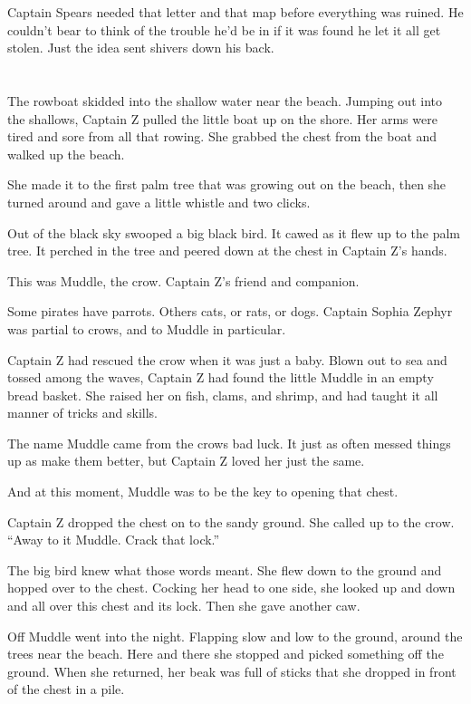 \documentclass[12pt]{extbook}
\begin{document}
  Captain Spears needed that letter and that map before everything was
  ruined. He couldn't bear to think of the trouble he'd be in if it was
  found he let it all get stolen. Just the idea sent shivers down his
  back.
  
  \section{}\label{section-10}
  
  The rowboat skidded into the shallow water near the beach. Jumping out
  into the shallows, Captain Z pulled the little boat up on the shore. Her
  arms were tired and sore from all that rowing. She grabbed the chest
  from the boat and walked up the beach.
  
  She made it to the first palm tree that was growing out on the beach,
  then she turned around and gave a little whistle and two clicks.
  
  Out of the black sky swooped a big black bird. It cawed as it flew up to
  the palm tree. It perched in the tree and peered down at the chest in
  Captain Z's hands.
  
  This was Muddle, the crow. Captain Z's friend and companion.
  
  Some pirates have parrots. Others cats, or rats, or dogs. Captain Sophia
  Zephyr was partial to crows, and to Muddle in particular.
  
  Captain Z had rescued the crow when it was just a baby. Blown out to sea
  and tossed among the waves, Captain Z had found the little Muddle in an
  empty bread basket. She raised her on fish, clams, and shrimp, and had
  taught it all manner of tricks and skills.
  
  The name Muddle came from the crows bad luck. It just as often messed
  things up as make them better, but Captain Z loved her just the same.
  
  And at this moment, Muddle was to be the key to opening that chest.
  
  Captain Z dropped the chest on to the sandy ground. She called up to the
  crow. \enquote{Away to it Muddle. Crack that lock.}
  
  The big bird knew what those words meant. She flew down to the ground
  and hopped over to the chest. Cocking her head to one side, she looked
  up and down and all over this chest and its lock. Then she gave another
  caw.
  
  Off Muddle went into the night. Flapping slow and low to the ground,
  around the trees near the beach. Here and there she stopped and picked
  something off the ground. When she returned, her beak was full of sticks
  that she dropped in front of the chest in a pile.
  
\end{document}

